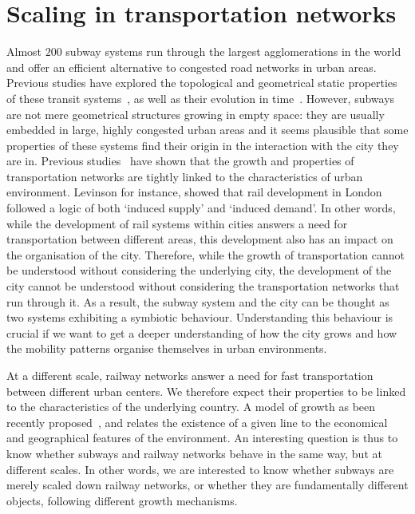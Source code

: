\chapter{Scaling in transportation networks}
\label{chap:scaling_networks}

Almost $200$ subway systems run through the largest agglomerations in the world
and offer an efficient alternative to congested road networks in urban areas.
Previous studies have explored the topological and geometrical static properties
of these transit systems~\cite{Derrible:2009,Levinson:2012}, as well as their
evolution in time~\cite{Roth:2012}. However, subways are not mere geometrical
structures growing in empty space: they are usually embedded in large, highly
congested urban areas and it seems plausible that some properties of these
systems find their origin in the interaction with the city they are in. Previous
studies~\cite{Levinson:2008,Xie:2009} have shown that the growth and properties
of transportation networks are tightly linked to the characteristics of urban
environment. Levinson \cite{Levinson:2008} for instance, showed that rail
development in London followed a logic of both `induced supply' and `induced
demand'. In other words, while the development of rail systems within cities
answers a need for transportation between different areas, this development also
has an impact on the organisation of the city. Therefore, while the growth of
transportation cannot be understood without considering the underlying city, the
development of the city cannot be understood without considering the
transportation networks that run through it. As a result, the subway system and
the city can be thought as two systems exhibiting a symbiotic behaviour.
Understanding this behaviour is crucial if we want to get a deeper understanding
of how the city grows and how the mobility patterns organise themselves in urban
environments.

At a different scale, railway networks answer a need for fast transportation
between different urban centers. We therefore expect their properties to be
linked to the characteristics of the underlying country. A model of growth as
been recently proposed~\cite{Louf:2013_emergence}, and relates the existence of a given
line to the economical and geographical features of the environment. An
interesting question is thus to know whether subways and railway networks behave
in the same way, but at different scales. In other words, we are interested to
know whether subways are merely scaled down railway networks, or whether they
are fundamentally different objects, following different growth mechanisms. 

